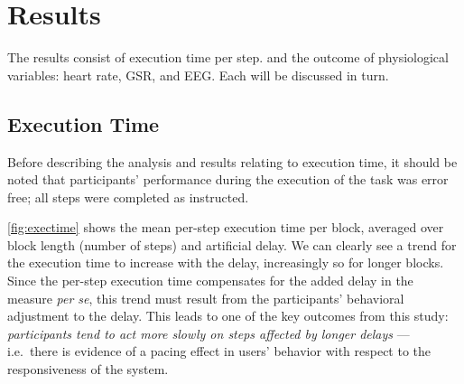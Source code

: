 \documentclass[10pt,letterpaper]{article}
\begin{document}
\section{Results}\label{sec:results}

The results consist of execution time per step. and the outcome of physiological variables: heart rate, GSR, and EEG.\@
Each will be discussed in turn.

\subsection{Execution Time}


Before describing the analysis and results relating to execution time, it should be noted that participants' performance during the execution of the task was error free; all steps were completed as instructed. 

\cref{fig:exectime} shows the mean per-step execution time per block, averaged over block length (number of steps) and artificial delay.
We can clearly see a trend for the execution time to increase with the delay, increasingly so for longer blocks. 
Since the per-step execution time  compensates for the added delay in the measure \emph{per se}, this trend must result from the participants' behavioral adjustment to the delay.
This leads to one of the key outcomes from this study: 
\emph{participants tend to act more slowly on steps affected by longer delays} --- i.e.\ there is evidence of a pacing effect in users' behavior with respect to the responsiveness of the system.
\end{document}

